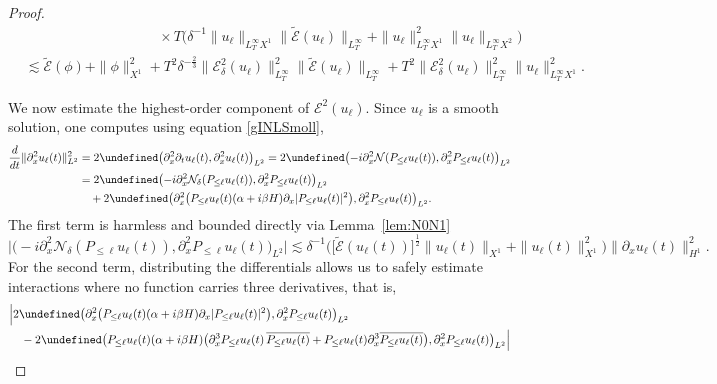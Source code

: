 \documentclass{amsart}
\numberwithin{equation}{section}
\let\Re=\undefined\DeclareMathOperator{\Re}{Re}
\begin{document}
\begin{proof}
\begin{equation}
\begin{aligned}
&\hspace{4cm} \times T\Big( \delta^{-1}\| u_\ell \|_{L^\infty_TX^1}\| \widetilde{\mathcal{E}}(u_\ell)\|_{L^\infty_T}+\| u_\ell \|_{L^\infty_TX^1}^2\| u_\ell \|_{L^\infty_TX^2}\Big) \\
&\lesssim \widetilde{\mathcal{E}}(\phi)+\| \phi \|_{X^1}^2+ T^2\delta^{-\frac23}\| \mathcal{E}^2_\delta(u_\ell) \|_{L^\infty_T}^2\| \widetilde{\mathcal{E}}(u_\ell) \|_{L^\infty_T} +T^2\| \mathcal{E}^2_\delta(u_\ell) \|_{L^\infty_T}^2\| u_\ell \|_{L^\infty_TX^1}^2.
\end{aligned}
\end{equation}

We now estimate the highest-order component of $\mathcal{E}^2(u_\ell)$. Since $u_\ell$ is a smooth solution, one computes using equation \eqref{gINLSmoll},
$$\begin{aligned}
\frac{d}{dt}\| \partial_x^2u_\ell(t) \|_{L^2}^2 &= 2\Re \big( \partial_x^2\partial_t u_\ell(t),\partial_x^2u_\ell(t)\big)_{L^2} = 2\Re \big( {-}i \partial_x^2\mathcal{N}(P_{\leq \ell}u_\ell(t)),\partial_x^2P_{\leq \ell}u_\ell(t)\big)_{L^2}  \\
&= 2\Re \big( {-}i\partial_x^2\mathcal{N}_\delta(P_{\leq \ell}u_\ell(t)) ,\partial_x^2P_{\leq \ell}u_\ell(t)\big)_{L^2} \\
&\quad + 2\Re \big( \partial_x^2\big( P_{\leq \ell}u_\ell(t)(\alpha +i\beta H)\partial_x |P_{\leq \ell}u_\ell(t)|^2\big) ,\partial_x^2P_{\leq \ell}u_\ell(t)\big)_{L^2}.
\end{aligned} $$
The first term is harmless and bounded directly via Lemma~\ref{lem:N0N1}
$$\Big| \big( {-}i\partial_x^2\mathcal{N}_\delta(P_{\leq \ell}u_\ell(t)) ,\partial_x^2P_{\leq \ell}u_\ell(t)\big)_{L^2} \Big| \lesssim \delta^{-1} \Big( \big[ \widetilde{\mathcal{E}}(u_\ell(t))\big] ^{\frac12}\|u_\ell(t)\|_{X^1}+\| u_\ell(t) \|_{X^1}^2\Big) \| \partial_xu_\ell(t) \|_{H^1}^2. $$
For the second term, distributing the differentials allows us to safely estimate interactions where no function carries three derivatives, that is,
$$\begin{aligned}
&\Big| 2\Re \big( \partial_x^2\big( P_{\leq \ell}u_\ell(t)(\alpha +i\beta H)\partial_x |P_{\leq \ell}u_\ell(t)|^2\big) ,\partial_x^2P_{\leq \ell}u_\ell(t)\big)_{L^2} \\
&\quad -2\Re \big( P_{\leq \ell}u_\ell(t)(\alpha +i\beta H)\big(\partial_x^3P_{\leq \ell}u_\ell(t)\,\overline{P_{\leq \ell}u_\ell(t)}+P_{\leq \ell}u_\ell(t)\partial_x^3\overline{P_{\leq \ell}u_\ell(t)}\big) ,\partial_x^2P_{\leq \ell}u_\ell(t)\big)_{L^2} \Big| \\

\end{aligned}$$
\end{proof}
\end{document}
